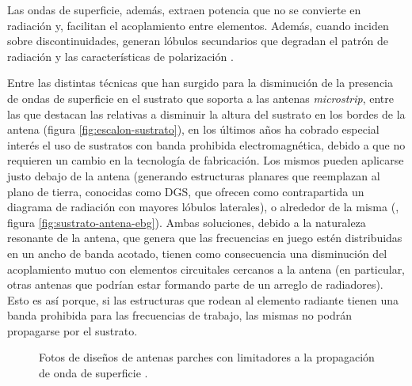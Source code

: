 Las ondas de superficie, además, extraen potencia que no se convierte en radiación y, facilitan el acoplamiento entre elementos. Además, cuando inciden sobre discontinuidades, generan lóbulos secundarios que degradan el patrón de radiación y las características de polarización \cite{Balanis:Theory}.

Entre las distintas técnicas que han surgido para la disminución de la presencia de ondas de superficie en el sustrato que soporta a las antenas \textit{microstrip}, entre las que destacan las relativas a disminuir la altura del sustrato en los bordes de la antena (figura \ref{fig:escalon-sustrato}), en los últimos años ha cobrado especial interés el uso de sustratos con banda prohibida electromagnética, debido a que no requieren un cambio en la tecnología de fabricación. Los mismos pueden aplicarse justo debajo de la antena (generando estructuras planares que reemplazan al plano de tierra, conocidas como DGS, que ofrecen como contrapartida un diagrama de radiación con mayores lóbulos laterales), o alrededor de la misma (\cite{Marcela:Tesis}, figura \ref{fig:sustrato-antena-ebg}). Ambas soluciones, debido a la naturaleza resonante de la antena, que genera que las frecuencias en juego estén distribuidas en un ancho de banda acotado, tienen como consecuencia una disminución del acoplamiento mutuo con elementos circuitales cercanos a la antena (en particular, otras antenas que podrían estar formando parte de un arreglo de radiadores). Esto es así porque, si las estructuras que rodean al elemento radiante tienen una banda prohibida para las frecuencias de trabajo, las mismas no podrán propagarse por el sustrato.


\begin{figure}[H]
	\centering 
	\hspace{30pt}
	\caption{Fotos de diseños de antenas parches con limitadores a la propagación de onda de superficie \cite{Yang:EBGAntennas}.}
	\label{fig:limitadores-ondas-superficie-yang}
\end{figure}

